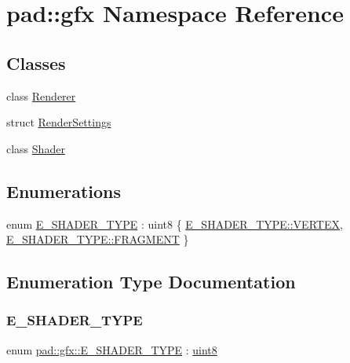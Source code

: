 \hypertarget{namespacepad_1_1gfx}{}\section{pad\+:\+:gfx Namespace Reference}
\label{namespacepad_1_1gfx}
\subsection*{Classes}
\begin{DoxyCompactItemize}
\item 
class \mbox{\hyperlink{classpad_1_1gfx_1_1_renderer}{Renderer}}
\item 
struct \mbox{\hyperlink{structpad_1_1gfx_1_1_render_settings}{Render\+Settings}}
\item 
class \mbox{\hyperlink{classpad_1_1gfx_1_1_shader}{Shader}}
\end{DoxyCompactItemize}
\subsection*{Enumerations}
\begin{DoxyCompactItemize}
\item 
enum \mbox{\hyperlink{namespacepad_1_1gfx_a04785a7d8a9087a9f0f2459a99a068a6}{E\+\_\+\+S\+H\+A\+D\+E\+R\+\_\+\+T\+Y\+PE}} \+: uint8 \{ \mbox{\hyperlink{namespacepad_1_1gfx_a04785a7d8a9087a9f0f2459a99a068a6a0c3e47aef93a7f244f41ab309a33634b}{E\+\_\+\+S\+H\+A\+D\+E\+R\+\_\+\+T\+Y\+P\+E\+::\+V\+E\+R\+T\+EX}}, 
\mbox{\hyperlink{namespacepad_1_1gfx_a04785a7d8a9087a9f0f2459a99a068a6a7345a249ed5c2f850d85dc1727c24716}{E\+\_\+\+S\+H\+A\+D\+E\+R\+\_\+\+T\+Y\+P\+E\+::\+F\+R\+A\+G\+M\+E\+NT}}
 \}
\end{DoxyCompactItemize}


\subsection{Enumeration Type Documentation}
\mbox{\label{namespacepad_1_1gfx_a04785a7d8a9087a9f0f2459a99a068a6}} 
\subsubsection{\texorpdfstring{E\+\_\+\+S\+H\+A\+D\+E\+R\+\_\+\+T\+Y\+PE}{E\_SHADER\_TYPE}}
{\footnotesize\ttfamily enum \mbox{\hyperlink{namespacepad_1_1gfx_a04785a7d8a9087a9f0f2459a99a068a6}{pad\+::gfx\+::\+E\+\_\+\+S\+H\+A\+D\+E\+R\+\_\+\+T\+Y\+PE}} \+: \mbox{\hyperlink{namespacepad_ac2d92bf238fe849ef0eab976bc6f6040}{uint8}}\hspace{0.3cm}{\ttfamily [strong]}}

